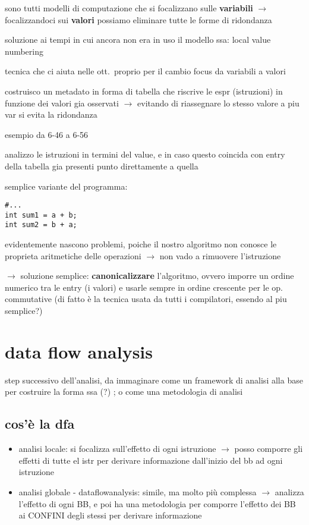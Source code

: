 sono tutti modelli di computazione che si focalizzano sulle \textbf{variabili} $\rightarrow$ focalizzandoci sui \textbf{valori} possiamo eliminare tutte le forme di ridondanza

soluzione ai tempi in cui ancora non era in uso il modello ssa: local value numbering

tecnica che ci aiuta nelle ott.~proprio per il cambio focus da variabili a valori

costruisco un metadato in forma di tabella che riscrive le espr (istruzioni) in funzione dei valori gia osservati $\rightarrow$ evitando di riassegnare lo stesso valore a piu var si evita la ridondanza

esempio da 6-46 a 6-56

analizzo le istruzioni in termini del value, e in caso questo coincida con entry della tabella gia presenti punto direttamente a quella

semplice variante del programma:
\begin{lstlisting}
#...
int sum1 = a + b;
int sum2 = b + a;\end{lstlisting}

evidentemente nascono problemi, poiche il nostro algoritmo non conosce le proprieta aritmetiche delle operazioni $\rightarrow$ non vado a rimuovere l'istruzione

$\rightarrow$ soluzione semplice: \textbf{canonicalizzare} l'algoritmo, ovvero imporre un ordine numerico tra le entry (i valori) e usarle sempre in ordine crescente per le op. commutative (di fatto \`e la tecnica usata da tutti i compilatori, essendo al piu semplice?)

\section{data flow analysis}

step successivo dell'analisi, da immaginare come un framework di analisi alla base per costruire la forma ssa (?) ; o come una metodologia di analisi

\subsection{cos'\`e la dfa}

\begin{itemize}
  \item analisi locale: si focalizza sull'effetto di ogni istruzione $\rightarrow$ posso comporre gli effetti di tutte el istr per derivare informazione dall'inizio del bb ad ogni istruzione
  \item analisi globale - dataflowanalysis: simile, ma molto pi\`u complessa $\rightarrow$ analizza l'effetto di ogni BB, e poi ha una metodologia per comporre l'effetto dei BB ai CONFINI degli stessi per derivare informazione
\end{itemize}

